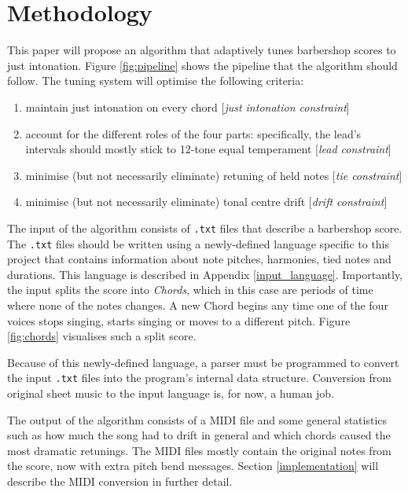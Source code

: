 \documentclass[a4paper]{article}
\begin{document}
\section{Methodology}
\label{methodoloy}
This paper will propose an algorithm that adaptively tunes barbershop scores to just intonation. Figure \ref{fig:pipeline} shows the pipeline that the algorithm should follow. The tuning system will optimise the following criteria:
\begin{enumerate}
	\item maintain just intonation on every chord [\textit{just intonation constraint}]
	\item account for the different roles of the four parts: specifically, the lead's intervals should mostly stick to 12-tone equal temperament [\textit{lead constraint}]
	\item minimise (but not necessarily eliminate) retuning of held notes [\textit{tie constraint}]
	\item minimise (but not necessarily eliminate) tonal centre drift [\textit{drift constraint}]
\end{enumerate}

The input of the algorithm consists of \verb+.txt+ files that describe a barbershop score. The \verb+.txt+ files should be written using a newly-defined language specific to this project that contains information about note pitches, harmonies, tied notes and durations. This language is described in Appendix \ref{input_language}. Importantly, the input splits the score into \textit{Chords}, which in this case are periods of time where none of the notes changes. A new Chord begins any time one of the four voices stops singing, starts singing or moves to a different pitch. Figure \ref{fig:chords} visualises such a split score.

Because of this newly-defined language, a parser must be programmed to convert the input \verb+.txt+ files into the program's internal data structure. Conversion from original sheet music to the input language is, for now, a human job.

The output of the algorithm consists of a MIDI file\cite{midi_manufacturers_association_complete_2014} and some general statistics such as how much the song had to drift in general and which chords caused the most dramatic retunings. The MIDI files mostly contain the original notes from the score, now with extra pitch bend messages. Section \ref{implementation} will describe the MIDI conversion in further detail.
\end{document}
